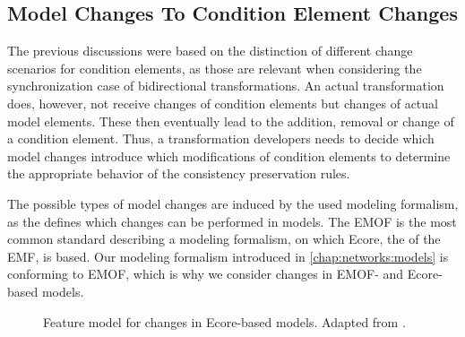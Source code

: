 

\subsection{Model Changes To Condition Element Changes}
\label{chap:synchronization:achieving:changes}

The previous discussions were based on the distinction of different change scenarios for condition elements, as those are relevant when considering the synchronization case of bidirectional transformations.
An actual transformation does, however, not receive changes of condition elements but changes of actual model elements.
These then eventually lead to the addition, removal or change of a condition element.
Thus, a transformation developers needs to decide which model changes introduce which modifications of condition elements to determine the appropriate behavior of the consistency preservation rules.

The possible types of model changes are induced by the used modeling formalism, as the \metametamodel defines which changes can be performed in models.
The \gls{EMOF} is the most common standard describing a modeling formalism, on which Ecore, the \metametamodel of the \gls{EMF}, is based.
Our modeling formalism introduced in \autoref{chap:networks:models} is conforming to \gls{EMOF}, which is why we consider changes in \gls{EMOF}- and Ecore-based models.


\begin{figure}
    \centering
    
    \caption[Feature model for changes in Ecore-based models]{Feature model for changes in Ecore-based models. Adapted from \cite[Fig. 5.3]{kramer2017a}.}
    \label{fig:synchronization:change_feature_model}
\end{figure}

